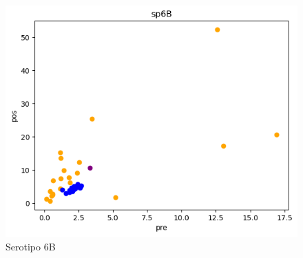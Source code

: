 \begin{figure}
    \begin{minipage}{0.45\textwidth}
        \centering
        \includegraphics[width=\linewidth]{Graphics/sp6bt.png}
        \caption{Serotipo 6B}
        \label{fig:sp6bt}
    \end{minipage}

\end{figure}